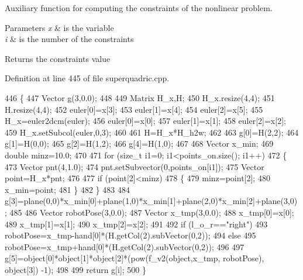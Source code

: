 Auxiliary function for computing the constraints of the nonlinear problem. 


\begin{DoxyParams}{Parameters}
{\em x} & is the variable \\
\hline
{\em i} & is the number of the constraints \\
\hline
\end{DoxyParams}
\begin{DoxyReturn}{Returns}
the constraints value 
\end{DoxyReturn}


Definition at line 445 of file superquadric.\+cpp.


\begin{DoxyCode}
446  \{
447      Vector g(3,0.0);
448 
449      Matrix H\_x,H;
450      H\_x.resize(4,4);
451      H.resize(4,4);
452      euler[0]=x[3];
453      euler[1]=x[4];
454      euler[2]=x[5];
455      H\_x=euler2dcm(euler);
456      euler[0]=x[0];
457      euler[1]=x[1];
458      euler[2]=x[2];
459      H\_x.setSubcol(euler,0,3);
460 
461      H=H\_x*H\_h2w;
462 
463      g[0]=H(2,2);
464      g[1]=H(0,0);
465      g[2]=H(1,2);
466      g[4]=H(1,0);
467 
468      Vector x\_min;
469      \textcolor{keywordtype}{double} minz=10.0;
470 
471      \textcolor{keywordflow}{for} (\textcolor{keywordtype}{size\_t} i1=0; i1<points\_on.size(); i1++)
472      \{
473          Vector pnt(4,1.0);
474          pnt.setSubvector(0,points\_on[i1]);
475          Vector point=H\_x*pnt;
476 
477          \textcolor{keywordflow}{if} (point[2]<minz)
478          \{
479              minz=point[2];
480              x\_min=point;
481          \}
482      \}
483 
484      g[3]=plane(0,0)*x\_min[0]+plane(1,0)*x\_min[1]+plane(2,0)*x\_min[2]+plane(3,0);
485 
486      Vector robotPose(3,0.0);
487      Vector x\_tmp(3,0.0);
488      x\_tmp[0]=x[0];
489      x\_tmp[1]=x[1];
490      x\_tmp[2]=x[2];
491 
492      \textcolor{keywordflow}{if} (l_o_r==\textcolor{stringliteral}{"right"})
493         robotPose=x\_tmp-hand[0]*(H.getCol(2).subVector(0,2));
494      \textcolor{keywordflow}{else}
495          robotPose=x\_tmp+hand[0]*(H.getCol(2).subVector(0,2));
496 
497      g[5]=\textcolor{keywordtype}{object}[0]*\textcolor{keywordtype}{object}[1]*\textcolor{keywordtype}{object}[2]*(pow(f_v2(\textcolor{keywordtype}{object},x\_tmp, robotPose), \textcolor{keywordtype}{object}[3]) -1);
498 
499      \textcolor{keywordflow}{return} g[i];
500  \}
\end{DoxyCode}
